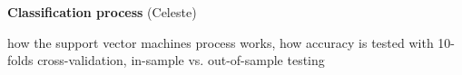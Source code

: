 \textbf{Classification process} (Celeste)

how the support vector machines process works, how accuracy is tested with 10-folds cross-validation, in-sample vs. out-of-sample testing


    